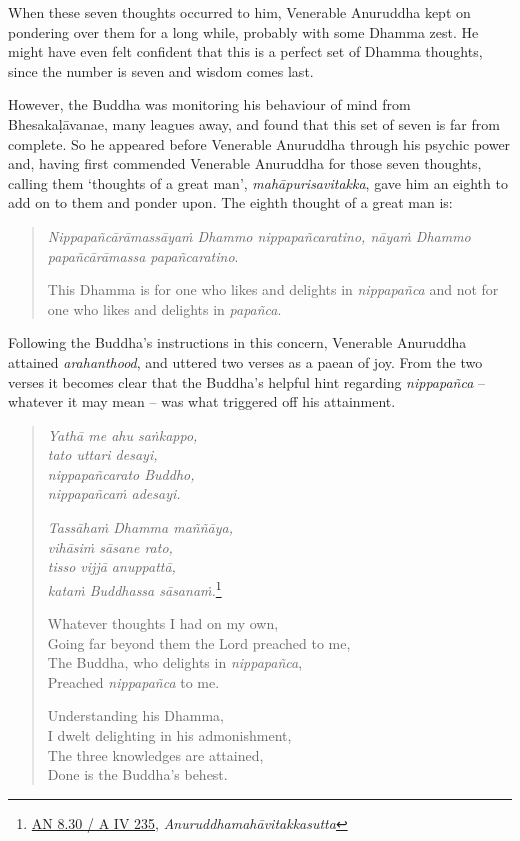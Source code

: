 When these seven thoughts occurred to him, Venerable Anuruddha kept on pondering over them for a long while, probably with some Dhamma zest. He might have even felt confident that this is a perfect set of Dhamma thoughts, since the number is seven and wisdom comes last.

However, the Buddha was monitoring his behaviour of mind from Bhesakaḷāvanae, many leagues away, and found that this set of seven is far from complete. So he appeared before Venerable Anuruddha through his psychic power and, having first commended Venerable Anuruddha for those seven thoughts, calling them `thoughts of a great man', \emph{mahāpurisavitakka}, gave him an eighth to add on to them and ponder upon. The eighth thought of a great man is:

\begin{quote}
\emph{Nippapañcārāmassāyaṁ Dhammo nippapañcaratino, nāyaṁ Dhammo papañcārāmassa papañcaratino}.

This Dhamma is for one who likes and delights in \emph{nippapañca} and not for one who likes and delights in \emph{papañca}.
\end{quote}

Following the Buddha's instructions in this concern, Venerable Anuruddha attained \emph{arahanthood}, and uttered two verses as a paean of joy. From the two verses it becomes clear that the Buddha's helpful hint regarding \emph{nippapañca} -- whatever it may mean -- was what triggered off his attainment.

\begin{quote}
\emph{Yathā me ahu saṅkappo,}\\
\emph{tato uttari desayi,}\\
\emph{nippapañcarato Buddho,}\\
\emph{nippapañcaṁ adesayi.}

\emph{Tassāhaṁ Dhamma maññāya,}\\
\emph{vihāsiṁ sāsane rato,}\\
\emph{tisso vijjā anuppattā,}\\
\emph{kataṁ Buddhassa sāsanaṁ.}\footnote{\href{https://suttacentral.net/an8.30/pli/ms}{AN 8.30 / A IV 235}, \emph{Anuruddhamahāvitakkasutta}}

Whatever thoughts I had on my own,\\
Going far beyond them the Lord preached to me,\\
The Buddha, who delights in \emph{nippapañca},\\
Preached \emph{nippapañca} to me.

Understanding his Dhamma,\\
I dwelt delighting in his admonishment,\\
The three knowledges are attained,\\
Done is the Buddha's behest.
\end{quote}

